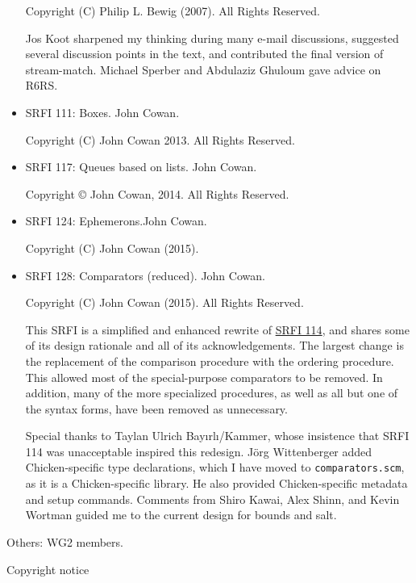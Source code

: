 \begin{itemize}
Copyright (C) Philip L. Bewig (2007). All Rights Reserved.

Jos Koot sharpened my thinking during many e-mail discussions, suggested
several discussion points in the text, and contributed the final version
of stream-match. Michael Sperber and Abdulaziz Ghuloum gave advice on
R6RS.

\item SRFI 111: Boxes. John Cowan.

Copyright (C) John Cowan 2013. All Rights Reserved.

\item SRFI 117: Queues based on lists. John Cowan.

Copyright © John Cowan, 2014. All Rights Reserved.

\item SRFI 124: Ephemerons.John Cowan.

Copyright (C) John Cowan (2015).

\item SRFI 128: Comparators (reduced). John Cowan.

Copyright (C) John Cowan (2015). All Rights Reserved.

This SRFI is a simplified and enhanced rewrite of
\href{http://srfi.schemers.org/srfi-114/srfi-114.html}{SRFI 114}, and
shares some of its design rationale and all of its acknowledgements. The
largest change is the replacement of the comparison procedure with the
ordering procedure. This allowed most of the special-purpose comparators
to be removed. In addition, many of the more specialized procedures, as
well as all but one of the syntax forms, have been removed as
unnecessary.

Special thanks to Taylan Ulrich Bayırlı/Kammer, whose insistence that
SRFI 114 was unacceptable inspired this redesign. Jörg Wittenberger
added Chicken-specific type declarations, which I have moved to
\texttt{comparators.scm}, as it is a Chicken-specific library. He also
provided Chicken-specific metadata and setup commands. Comments from
Shiro Kawai, Alex Shinn, and Kevin Wortman guided me to the current
design for bounds and salt.



\end{itemize}

Others: WG2 members.

Copyright notice


